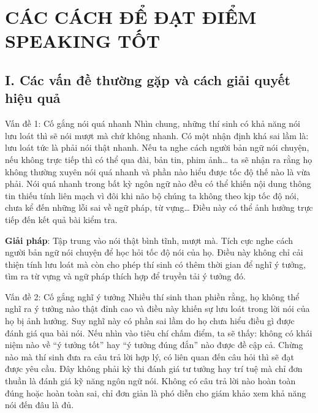 \newpage
\section*{CÁC CÁCH ĐỂ ĐẠT ĐIỂM SPEAKING TỐT}
\label{sec:Strats}

\subsection*{I. Các vấn đề thường gặp và cách giải quyết hiệu quả}

\begin{multicols}{2}
\begin{qa}{Vấn đề 1: Cố gắng nói quá nhanh}
Nhìn chung, những thí sinh có khả năng nói lưu loát thì sẽ nói mượt mà chứ không nhanh. Có một nhận định khá sai lầm là: lưu loát tức là phải nói thật nhanh. Nếu ta nghe cách người bản ngữ nói chuyện, nếu không trực tiếp thì có thể qua đài, bản tin, phim ảnh… ta sẽ nhận ra rằng họ không thường xuyên nói quá nhanh và phần nào hiểu được tốc độ thế nào là vừa phải. Nói quá nhanh trong bất kỳ ngôn ngữ nào đều có thể khiến nội dung thông tin thiếu tính liên mạch vì đôi khi não bộ chúng ta không theo kịp tốc độ nói, chưa kể đến những lỗi sai về ngữ pháp, từ vựng… Điều này có thể ảnh hưởng trực tiếp đến kết quả bài kiểm tra.

\vspace{.2cm}
\textbf{Giải pháp}: Tập trung vào nói thật bình tĩnh, mượt mà. Tích cực nghe cách người bản ngữ nói chuyện để học hỏi tốc độ nói của họ. Điều này không chỉ cải thiện tính lưu loát mà còn cho phép thí sinh có thêm thời gian để nghĩ ý tưởng, tìm ra từ vựng và ngữ pháp thích hợp để truyền tải ý tưởng đó.
\end{qa}

\begin{qa}{Vấn đề 2: Cố gắng nghĩ ý tưởng}
Nhiều thí sinh than phiền rằng, họ không thể nghĩ ra ý tưởng nào thật đỉnh cao và điều này khiến sự lưu loát trong lời nói của họ bị ảnh hưởng. Suy nghĩ này có phần sai lầm do họ chưa hiểu điều gì được đánh giá qua bài nói. Nếu nhìn vào tiêu chí chấm điểm, ta sẽ thấy: không có khái niệm nào về “ý tưởng tốt” hay “ý tưởng đúng đắn” nào được đề cập cả. Chừng nào mà thí sinh đưa ra câu trả lời hợp lý, có liên quan đến câu hỏi thì sẽ đạt được yêu cầu. Đây không phải kỳ thi đánh giá tư tưởng hay trí tuệ mà chỉ đơn thuần là đánh giá kỹ năng ngôn ngữ nói. Không có câu trả lời nào hoàn toàn đúng hoặc hoàn toàn sai, chỉ đơn giản là phó diễn cho giám khảo xem khả năng nói đến đâu là đủ.


\end{qa}
\end{multicols}
